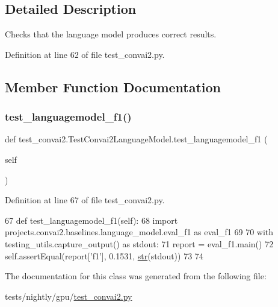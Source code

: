 \subsection{Detailed Description}
\begin{DoxyVerb}Checks that the language model produces correct results.
\end{DoxyVerb}
 

Definition at line 62 of file test\+\_\+convai2.\+py.



\subsection{Member Function Documentation}
\mbox{\label{classtest__convai2_1_1TestConvai2LanguageModel_a854c13ca56bdf47737d0e54a5e012405}} 
\subsubsection{\texorpdfstring{test\+\_\+languagemodel\+\_\+f1()}{test\_languagemodel\_f1()}}
{\footnotesize\ttfamily def test\+\_\+convai2.\+Test\+Convai2\+Language\+Model.\+test\+\_\+languagemodel\+\_\+f1 (\begin{DoxyParamCaption}\item[{}]{self }\end{DoxyParamCaption})}



Definition at line 67 of file test\+\_\+convai2.\+py.


\begin{DoxyCode}
67     \textcolor{keyword}{def }test\_languagemodel\_f1(self):
68         \textcolor{keyword}{import} projects.convai2.baselines.language\_model.eval\_f1 \textcolor{keyword}{as} eval\_f1
69 
70         with testing\_utils.capture\_output() \textcolor{keyword}{as} stdout:
71             report = eval\_f1.main()
72         self.assertEqual(report[\textcolor{stringliteral}{'f1'}], 0.1531, \hyperlink{namespacegenerate__task__READMEs_a5b88452ffb87b78c8c85ececebafc09f}{str}(stdout))
73 
74 
\end{DoxyCode}


The documentation for this class was generated from the following file\+:\begin{DoxyCompactItemize}
\item 
tests/nightly/gpu/\hyperlink{test__convai2_8py}{test\+\_\+convai2.\+py}\end{DoxyCompactItemize}
